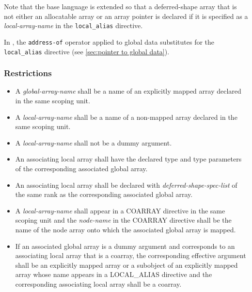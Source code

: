 Note that the base language {\Fort} is extended so that a deferred-shape
array that is not either an allocatable array or an array pointer is
declared if it is specified as a 
{\it local-array-name} in the {\tt local\_alias} directive.

In {\XMPC}, the {\tt address-of} operator applied to global data
substitutes for the {\tt local\_alias} directive (see \ref{sec:pointer
to global data}).


\subsubsection*{Restrictions}

\begin{itemize}
 \item A {\it global-array-name} shall be a name of an explicitly mapped
       array declared in the same scoping unit. 

 \item A {\it local-array-name} shall be a name of a non-mapped array
       declared in the same scoping unit. 

 \item A {\it local-array-name} shall not be a dummy argument.

 \item An associating local array shall have the declared type and type parameters of
       the corresponding associated global array.

 \item An associating local array shall be declared with
       {\it deferred-shape-spec-list} of the
       same rank as the corresponding associated global array.

 \item A {\it local-array-name} shall appear in a COARRAY directive in the
       same scoping unit and the {\it node-name} in the COARRAY directive
       shall be the name of the node array onto which the
       associated global array is mapped.

 \item 
If an associated global array is a dummy argument and corresponds to
an associating local array that is a coarray, 
the corresponding effective argument shall be
an explicitly mapped array or a subobject of 
an explicitly mapped array whose name appears
in a LOCAL\_ALIAS directive %
and the corresponding associating local array shall be a coarray.


\end{itemize}
